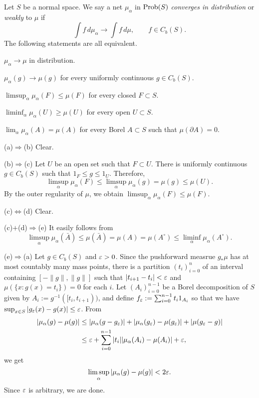 \documentclass{../../large}
\begin{document}




\begin{prb}
Let $S$ be a normal space.
We say a net $\mu_\alpha$ in $\operatorname{Prob}(S)$ \emph{converges in distribution} or \emph{weakly} to $\mu$ if
\[\int f\,d\mu_\alpha\to\int f\,d\mu,\qquad f\in C_b(S).\]
The following statements are all equivalent.
\begin{parts}
\item $\mu_\alpha\to\mu$ in distribution.
\item $\mu_\alpha(g)\to\mu(g)$ for every uniformly continuous $g\in C_b(S)$.
\item $\limsup_\alpha\mu_\alpha(F)\le\mu(F)$ for every closed $F\subset S$.
\item $\liminf_\alpha\mu_\alpha(U)\ge\mu(U)$ for every open $U\subset S$.
\item $\lim_\alpha\mu_\alpha(A)=\mu(A)$ for every Borel $A\subset S$ such that $\mu(\partial A)=0$.
\end{parts}
\end{prb}
\begin{pf}
(a)$\Rightarrow$(b)
Clear.

(b)$\Rightarrow$(c)
Let $U$ be an open set such that $F\subset U$.
There is uniformly continuous $g\in C_b(S)$ such that $1_F\le g\le1_U$.
Therefore,
\[\limsup_\alpha\mu_\alpha(F)\le\limsup_\alpha\mu_\alpha(g)=\mu(g)\le\mu(U).\]
By the outer regularity of $\mu$, we obtain $\limsup_\alpha\mu_\alpha(F)\le\mu(F)$.

(c)$\Leftrightarrow$(d)
Clear.

(c)$+$(d)$\Rightarrow$(e)
It easily follows from
\[\limsup_\alpha\mu_\alpha(\bar A)\le\mu(\bar A)=\mu(A)=\mu(A^\circ)\le\liminf_\alpha\mu_\alpha(A^\circ).\]

(e)$\Rightarrow$(a)
Let $g\in C_b(S)$ and $\varepsilon>0$.
Since the pushforward measrue $g_*\mu$ has at most countably many mass points, there is a partition $(t_i)_{i=0}^n$ of an interval containing $[-\|g\|,\|g\|]$ such that $|t_{i+1}-t_i|<\varepsilon$ and $\mu(\{x:g(x)=t_i\})=0$ for each $i$.
Let $(A_i)_{i=0}^{n-1}$ be a Borel decomposition of $S$ given by $A_i:=g^{-1}([t_i,t_{i+1}))$, and define $f_\varepsilon:=\sum_{i=0}^{n-1}t_i1_{A_i}$ so that we have $\sup_{x\in S}|g_\varepsilon(x)-g(x)|\le\varepsilon$.
From
\begin{align*}
|\mu_\alpha(g)-\mu(g)|&\le|\mu_\alpha(g-g_\varepsilon)|+|\mu_\alpha(g_\varepsilon)-\mu(g_\varepsilon)|+|\mu(g_\varepsilon-g)|\\
&\le\varepsilon+\sum_{i=0}^{n-1}|t_i||\mu_\alpha(A_i)-\mu(A_i)|+\varepsilon,
\end{align*}
we get
\[\limsup_\alpha|\mu_\alpha(g)-\mu(g)|<2\varepsilon.\]
Since $\varepsilon$ is arbitrary, we are done.
\end{pf}
\end{document}
